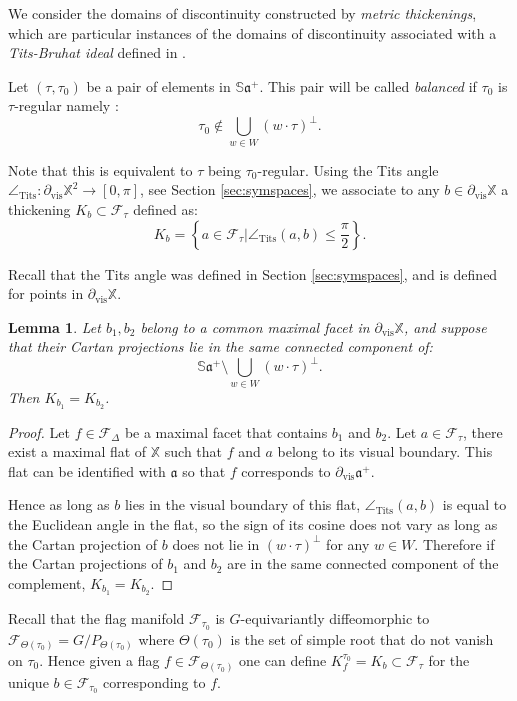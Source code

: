 \documentclass[reqno,10pt]{amsart}
\theoremstyle{plain}
\newtheorem{lem}[thm]{Lemma}
\theoremstyle{definition}
\theoremstyle{remark}
\newcommand{\type}{\tau}
\newcommand{\typeS}{{\tau_0}}
\newcommand{\Sph}{\mathbb{S}}
\newcommand{\Tangle}{\angle_\text{Tits}}
\DeclareMathOperator{\vis}{vis}
\newcommand{\partialvis}{\partial_{\vis}}
\newcommand{\X}{\mathbb{X}}
\newcommand{\ie}{namely }
\begin{document}
We consider the domains of discontinuity constructed by \emph{metric thickenings}, which are particular instances of the domains of discontinuity associated with a \emph{Tits-Bruhat ideal} defined in \cite{KLP-DoD}.

\medskip

Let $(\type,\typeS)$ be a pair of elements in $\Sph\mathfrak{a}^+$. This pair will be called \emph{balanced} if $\typeS$ is $\type$-regular \ie:
$$\typeS\notin \bigcup_{w\in W}(w\cdot \type)^\perp .$$

Note that this is equivalent to $\type$ being $\typeS$-regular. Using the Tits angle $\Tangle:\partialvis \X ^2\to [0,\pi]$, see Section \ref{sec:symspaces}, we associate to any $b\in\partialvis \X$ a thickening $K_b\subset\mathcal{F}_\type$ defined as:
$$K_b=\left\lbrace a\in \mathcal{F}_\type|\Tangle(a,b)\leq \frac{\pi}{2} \right\rbrace.$$

Recall that the Tits angle was defined in Section \ref{sec:symspaces}, and is defined for points in $\partialvis \X$.

\begin{lem}
\label{lem:thickeningConnected}
Let $b_1,b_2$ belong to a common maximal facet in $\partialvis \X$, and suppose that their Cartan projections lie in the same connected component of:
 $$\Sph\mathfrak{a}^+\setminus \bigcup_{w\in W} (w\cdot \type)^\perp.$$
Then $K_{b_1}=K_{b_2}$.
\end{lem}

\begin{proof}
Let $f\in \mathcal{F}_\Delta$ be a maximal facet that contains $b_1$ and $b_2$. Let $a\in \mathcal{F}_\type$, there exist a  maximal flat of $\X$ such that $f$ and $a$ belong to its visual boundary. This flat can be identified with $\mathfrak{a}$ so that $f$ corresponds to $\partialvis \mathfrak{a}^+$. 

\medskip

Hence as long as $b$ lies in the visual boundary of this flat, $\Tangle(a,b)$ is equal to the Euclidean angle in the flat, so the sign of its cosine does not vary as long as the Cartan projection of $b$ does not lie in $(w\cdot \type)^\perp$ for any $w\in W$. Therefore if the Cartan projections of $b_1$ and $b_2$ are in the same connected component of the complement, $K_{b_1}=K_{b_2}$.
\end{proof}

 Recall that the flag manifold $\mathcal{F}_\typeS$ is $G$-equivariantly diffeomorphic to $\mathcal{F}_{\Theta(\typeS)}=G/P_{\Theta(\type_0)}$ where $\Theta(\typeS)$ is the set of simple root that do not vanish on $\typeS$. Hence given a flag $f\in \mathcal{F}_{\Theta(\type_0)}$ one can define $K_f^\typeS=K_b\subset \mathcal{F}_\type$ for the unique $b\in \mathcal{F}_\typeS$ corresponding to $f$.
\end{document}
